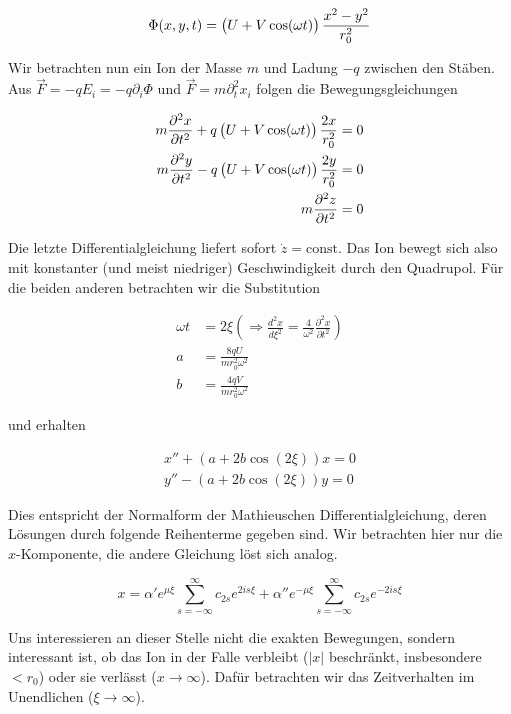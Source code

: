 \documentclass[a4paper,german,12pt,smallheadings]{scrartcl}
\begin{document}
\begin{equation}
  \Phi(x,y,t) = \del{U + V \cos(\omega t)} \frac{x^2-y^2}{r_0^2}
\end{equation}

Wir betrachten nun ein Ion der Masse $m$ und Ladung $-q$ zwischen den Stäben.
Aus $\vec{F} = -q E_i = -q \partial_i \Phi$ und $\vec{F} = m \partial_t^2 x_i$
folgen die Bewegungsgleichungen

\begin{align}
  m \frac{\partial^2 x}{\partial t^2} + q \del{U + V \cos(\omega t)} \frac{2 x}{r_0^2} &= 0 \\
  m \frac{\partial^2 y}{\partial t^2} - q \del{U + V \cos(\omega t)} \frac{2 y}{r_0^2} &= 0 \\
  m \frac{\partial^2 z}{\partial t^2} &= 0
\end{align}

Die letzte Differentialgleichung liefert sofort $\dot z = \text{const}$. Das
Ion bewegt sich also mit konstanter (und meist niedriger) Geschwindigkeit durch
den Quadrupol. Für die beiden anderen betrachten wir die Substitution

\begin{align}
  \omega t &= 2 \xi \left(\Rightarrow \frac{d^2 x}{d \xi^2}=\frac{4}{\omega^2}\frac{\partial^2 x}{\partial t^2} \right) \\
  a &= \frac{8qU}{m r_0^2 \omega^2} \\
  b &= \frac{4qV}{m r_0^2 \omega^2}
\end{align}

und erhalten

\begin{align}
  x'' + (a + 2 b \cos(2 \xi)) x = 0 \\
  y'' - (a + 2 b \cos(2 \xi)) y = 0 
\end{align}

Dies entspricht der Normalform der Mathieuschen Differentialgleichung, deren
Lösungen durch folgende Reihenterme gegeben sind. Wir betrachten hier nur die
$x$-Komponente, die andere Gleichung löst sich analog.

\begin{equation}
  x = \alpha' e^{\mu \xi} \sum_{s=-\infty}^{\infty} c_{2s} e^{2is \xi} + \alpha'' e^{-\mu \xi} \sum_{s=-\infty}^{\infty} c_{2s} e^{-2is \xi}
\end{equation}

Uns interessieren an dieser Stelle nicht die exakten Bewegungen, sondern
interessant ist, ob das Ion in der Falle verbleibt ($|x|$ beschränkt, insbesondere $<r_0$) oder sie
verlässt ($x \to \infty$). Dafür betrachten wir das Zeitverhalten im
Unendlichen ($\xi \to \infty$).
\end{document}
